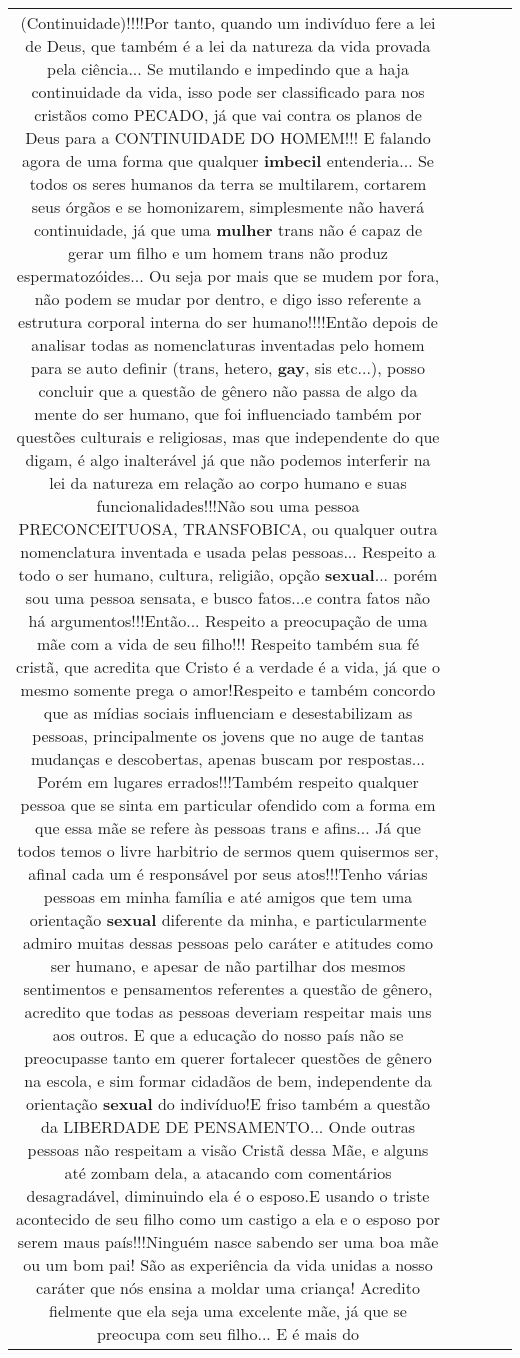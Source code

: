 \documentclass[11pt]{article}
\newlength\mylength
\begin{document}
\begin{center}
\begin{longtable}{|C{.65\mylength}|C{.30\mylength}|C{.12\mylength}|C{.12\mylength}|C{.12\mylength}|}
(Continuidade)!!!!Por tanto, quando um indivíduo fere a lei de Deus, que também é a lei da natureza da vida provada pela ciência... Se mutilando e impedindo que a haja continuidade da vida, isso pode ser classificado para nos cristãos como PECADO, já que vai contra os planos de Deus para a CONTINUIDADE DO HOMEM!!! E falando agora de uma forma que qualquer \textbf{imbecil} entenderia... Se todos os seres humanos da terra se multilarem, cortarem seus órgãos e se homonizarem, simplesmente não haverá continuidade, já que uma \textbf{mulher} trans não é capaz de gerar um filho e um homem trans não produz espermatozóides... Ou seja por mais que se mudem por fora, não podem se mudar por dentro, e digo isso referente a estrutura corporal interna do ser humano!!!!Então depois de analisar todas as nomenclaturas inventadas pelo homem para se auto definir (trans, hetero, \textbf{gay}, sis etc...), posso concluir que a questão de gênero não passa de algo da mente do ser humano, que foi influenciado também por questões culturais e religiosas, mas que independente do que digam, é algo inalterável já que não podemos interferir na lei da natureza em relação ao corpo humano e suas funcionalidades!!!Não sou uma pessoa PRECONCEITUOSA, TRANSFOBICA, ou qualquer outra nomenclatura inventada e usada pelas pessoas... Respeito a todo o ser humano, cultura, religião, opção \textbf{sexual}... porém sou uma pessoa sensata, e busco fatos...e contra fatos não há argumentos!!!Então... Respeito a preocupação de uma mãe com a vida de seu filho!!! Respeito também sua fé cristã, que acredita que Cristo é a verdade é a vida, já que o mesmo somente prega o amor!Respeito e também concordo que as mídias sociais influenciam e desestabilizam as pessoas, principalmente os jovens que no auge de tantas mudanças e descobertas, apenas buscam por respostas... Porém em lugares errados!!!Também respeito qualquer pessoa que se sinta em particular ofendido com a forma em que essa mãe se refere às pessoas trans e afins... Já que todos temos o livre harbitrio de sermos quem quisermos ser, afinal cada um é responsável por seus atos!!!Tenho várias pessoas em minha família e até amigos que tem uma orientação \textbf{sexual} diferente da minha, e particularmente admiro muitas dessas pessoas pelo caráter e atitudes como ser humano, e apesar de não partilhar dos mesmos sentimentos e pensamentos referentes a questão de gênero, acredito que todas as pessoas deveriam respeitar mais uns aos outros. E que a educação do nosso país não se preocupasse tanto em querer fortalecer questões de gênero na escola, e sim formar cidadãos de bem, independente da orientação \textbf{sexual} do indivíduo!E friso também a questão da LIBERDADE DE PENSAMENTO...  Onde outras pessoas não respeitam a visão Cristã dessa Mãe, e alguns até zombam dela, a atacando com comentários desagradável, diminuindo ela é o esposo.E usando o triste acontecido de seu filho como um castigo a ela e o esposo por serem maus país!!!Ninguém nasce sabendo ser uma boa mãe ou um bom pai! São as experiência da vida unidas a nosso caráter que nós ensina a moldar uma criança! Acredito fielmente que ela seja uma excelente mãe, já que se preocupa com seu filho... E é mais do 
\end{longtable}
\end{center}
\end{document}
